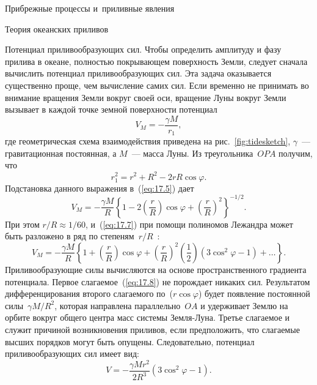\begin{chapter}{Прибрежные процессы и~приливные явления}
\begin{section}{Теория океанских приливов}
\begin{paragraph}{Потенциал приливообразующих сил.}
Чтобы определить амплитуду и фазу прилива в океане, полностью покрывающем
поверхность Земли, следует сначала вычислить потенциал приливообразующих 
сил. Эта задача оказывается 
существенно проще, чем вычисление самих сил. Если временно не принимать
во внимание вращения Земли вокруг своей оси, вращение Луны
вокруг Земли вызывает в каждой точке земной поверхности потенциал
\begin{equation}\label{eq:17.5}
  V_{M} = -\frac{\gamma M}{r_{1}},
\end{equation}
где геометрическая схема взаимодействия приведена на рис.~\ref{fig:tidesketch},
$\gamma $~--- гравитационная постоянная, а $M$~--- масса Луны. 
Из треугольника~$OPA$ получим, что
\begin{equation}
  r_{1}^{2} = r^{2} + R^{2} - 2 r R \cos \varphi.
\end{equation}
Подстановка данного выражения в~(\ref{eq:17.5}) дает
\begin{equation}\label{eq:17.7}
  V_{M} = -\frac{\gamma M}{R} 
   \left\{ 1 - 2 \left(\frac{r}{R}\right) \cos \varphi 
           + \left(\frac{r}{R}\right)^{2}\right\}^{-1/2}.
\end{equation}
При этом $r/R \approx 1/60$, и~(\ref{eq:17.7}) при помощи полиномов Лежандра 
может быть разложено в ряд по 
степеням~$r/R$~\cite[\S~15.1]{Whittaker:1963}:
\begin{equation}\label{eq:17.8}
 V_M = -\frac{\gamma M}{R} 
    \left\{1+\left(\frac{r}{R}\right) \cos \varphi 
            +\left(\frac{r}{R}\right)^2 \left(\frac{1}{2}\right) (3\cos ^2 \varphi - 1) 
            + \ldots
    \right\}.
\end{equation}
Приливообразующие силы вычисляются на основе пространственного градиента
потенциала. Первое слагаемое~(\ref{eq:17.8}) не порождает никаких сил.
Результатом дифференцирования второго слагаемого по~($r \cos \varphi $) 
будет появление постоянной силы~$\gamma M/R^{2}$, которая направлена
параллельно~$OA$ и удерживает Землю на орбите вокруг общего центра масс 
системы Земля-Луна. Третье слагаемое и служит причиной возникновения
приливов, если предположить, что слагаемые высших порядков могут быть
опущены. Следовательно, потенциал приливообразующих сил имеет вид:
\begin{equation}\label{eq:17.9}
 V= -\frac{\gamma M r^{2}}{2 R^{3}} (3 \cos ^2 \varphi - 1).
\end{equation}
%

\end{paragraph}
\end{section}
\end{chapter}
